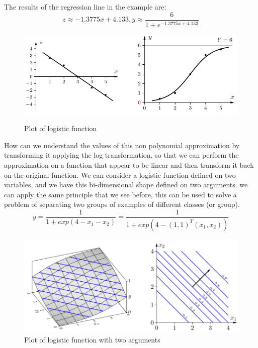 \documentclass{article}
\begin{document}
The results of the regression line in the example are:
$$z\approx -1.3775x+4.133, y\approx\frac{6}{1+e^{-1.3775x+4.133}}$$
\begin{figure}[H]
    \centering
    \includegraphics[scale=0.5]{images/regression_line_2.png}
    \label{fig_regr_2}
    \caption{Plot of logistic function}
\end{figure}
How can we understand the values of this non polynomial approximation by transforming it
applying the log transformation, so that we can perform the approximation on a
function that appear to be linear and then transform it back on the original function.
\newline\newline
We can consider a logistic function defined on two variables, and we have this bi-dimensional
shape defined on two arguments. we can apply the same principle that we see before, this
can be used to solve a problem of separating two groups of examples of different classes (or
group).
$$y=\frac{1}{1+exp(4-x_1-x_2)}=\frac{1}{1+exp\left(4-(1,1)^T(x_1,x_2)\right)}$$
\begin{figure}[H]
    \centering
    \includegraphics[scale=0.45]{images/logist_bidiminesional_reg.png}
    \caption{Plot of logistic function with two arguments}
\end{figure}
\end{document}

